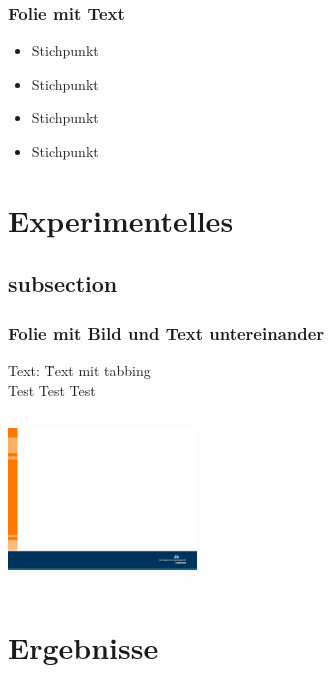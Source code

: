 \begin{frame}
	\frametitle{Folie mit Text}
	\vskip5mm
	\vspace{-0.4cm}%
	\begin{itemize}
		\itemsep1.2em
		\item Stichpunkt
		\item Stichpunkt
		\item Stichpunkt
		\item Stichpunkt
	\end{itemize}
\end{frame}

\section{Experimentelles}
\subsection{subsection}
\begin{frame}
\frametitle{Folie mit Bild und Text untereinander}
\begin{tabbing}
	Text: \qquad \= Text mit tabbing\\
	\> Test Test Test\\
\end{tabbing}
	\vskip5mm
	\begin{columns}
		\column{12cm}
		\centering
		\includegraphics[width=5.0cm]{style/images/master_background}\\
	\end{columns}
\end{frame}

\section{Ergebnisse}
